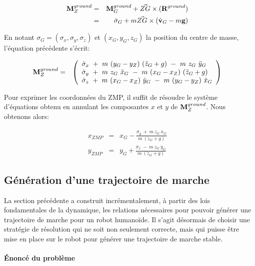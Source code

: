 \begin{eqnarray*}
\textbf{M}_Z^{ground} &=& \textbf{M}_G^{ground} + \vec{ZG} \times (\textbf{R}^{ground}) \\
&=& \dot{\sigma}_G + m \vec{ZG} \times (\dot{\textbf{v}}_G - m\textbf{g})
\end{eqnarray*}

En notant $\sigma_G = ({\sigma}_x, {\sigma}_y, {\sigma}_z)$ et $(x_G,
y_G, z_G)$ la position du centre de masse, l'équation précédente
s'écrit:

\begin{eqnarray*}
\vect{M}_Z^{ground} &=& \left(\begin{array}{lll}
\dot{\sigma}_x\ +\ m\ (y_G - y_Z)\ (\ddot{z}_G + g)\ -\ m\ z_G\ \ddot{y}_G \\
\dot{\sigma}_y\ +\ m\ z_G\ \ddot{x}_G\ -\ m\ (x_G-x_Z)\ (\ddot{z}_G + g) \\
\dot{\sigma}_z\ +\ m\ (x_G - x_Z)\ \ddot{y}_G\ -\ m\ (y_G-y_Z)\ \ddot{x}_G
\end{array}\right)
\end{eqnarray*}

Pour exprimer les coordonnées du ZMP, il suffit de résoudre le système
d'équations obtenu en annulant les composantes $x$ et $y$ de
$\textbf{M}_Z^{ground}$. Nous obtenons alors:

\begin{eqnarray*}
x_{ZMP} &=& x_G - \frac{\dot{\sigma}_y\ +\ m\ z_G\ \ddot{x}_G}{m\ (\ddot{z}_G + g)} \\
y_{ZMP} &=& y_G + \frac{\dot{\sigma}_x\ -\ m\ z_G\ \ddot{y}_G}{m\ (\ddot{z}_G + g)}
\end{eqnarray*}



\subsection{Génération d'une trajectoire de marche}

La section précédente a construit incrémentalement, à partir des lois
fondamentales de la dynamique, les relations nécessaires pour pouvoir
générer une trajectoire de marche pour un robot humanoïde. Il s'agit
désormais de choisir une stratégie de résolution qui ne soit non
seulement correcte, mais qui puisse être mise en place sur le robot
pour générer une trajectoire de marche stable.

\paragraph{Énoncé du problème}

